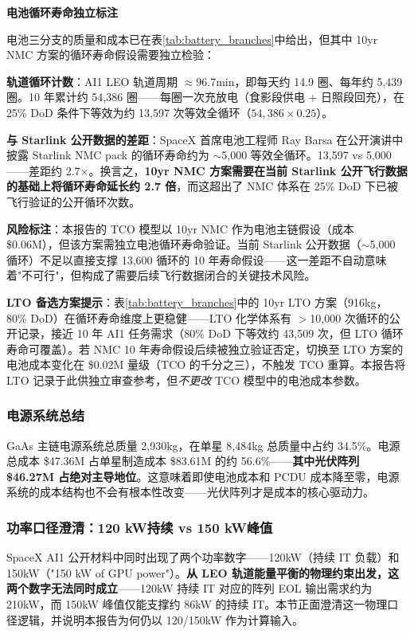 \medskip
\noindent\textbf{电池循环寿命独立标注}

电池三分支的质量和成本已在表\ref{tab:battery_branches}中给出，但其中 10yr NMC 方案的循环寿命假设需要独立检验：

\smallskip
\noindent\textbf{轨道循环计数}：AI1 LEO 轨道周期 $\approx$96.7\;min，即每天约 14.9 圈、每年约 5,439 圈。10 年累计约 54,386 圈——每圈一次充放电（食影段供电 + 日照段回充），在 25\% DoD 条件下等效为约 13,597 次等效全循环（$54{,}386 \times 0.25$）。

\smallskip
\noindent\textbf{与 Starlink 公开数据的差距}：SpaceX 首席电池工程师 Ray Barsa 在公开演讲中披露 Starlink NMC pack 的循环寿命约为 $\sim$5,000 等效全循环。13,597 vs 5,000——差距约 2.7$\times$。换言之，\textbf{10yr NMC 方案需要在当前 Starlink 公开飞行数据的基础上将循环寿命延长约 2.7 倍}，而这超出了 NMC 体系在 25\% DoD 下已被飞行验证的公开循环次数。

\smallskip
\noindent\textbf{风险标注}：本报告的 TCO 模型以 10yr NMC 作为电池主链假设（成本 \$0.06M），但该方案需独立电池循环寿命验证。当前 Starlink 公开数据（$\sim$5,000 循环）不足以直接支撑 13,600 循环的 10 年寿命假设——这一差距不自动意味着"不可行"，但构成了需要后续飞行数据闭合的关键技术风险。

\smallskip
\noindent\textbf{LTO 备选方案提示}：表\ref{tab:battery_branches}中的 10yr LTO 方案（916\;kg，80\% DoD）在循环寿命维度上更稳健——LTO 化学体系有 $>$10,000 次循环的公开记录，接近 10 年 AI1 任务需求（80\% DoD 下等效约 43,509 次，但 LTO 循环寿命可覆盖）。若 NMC 10 年寿命假设后续被独立验证否定，切换至 LTO 方案的电池成本变化在 \$0.02M 量级（TCO 的千分之三），不触发 TCO 重算。本报告将 LTO 记录于此供独立审查参考，但\emph{不更改} TCO 模型中的电池成本参数。

\subsubsection{电源系统总结}

GaAs 主链电源系统总质量 2,930\;kg，在单星 8,484\;kg 总质量中占约 34.5\%。电源总成本 \$47.36M 占单星制造成本 \$83.61M 的约 56.6\%——\textbf{其中光伏阵列 \$46.27M 占绝对主导地位}。这意味着即使电池成本和 PCDU 成本降至零，电源系统的成本结构也不会有根本性改变——光伏阵列才是成本的核心驱动力。

\subsubsection{功率口径澄清：120 kW持续 vs 150 kW峰值}

SpaceX AI1 公开材料中同时出现了两个功率数字——120\;kW（持续 IT 负载）和 150\;kW（"150 kW of GPU power"）。\textbf{从 LEO 轨道能量平衡的物理约束出发，这两个数字无法同时成立}——120\;kW 持续 IT 对应的阵列 EOL 输出需求约为 210\;kW，而 150\;kW 峰值仅能支撑约 86\;kW 的持续 IT。本节正面澄清这一物理口径逻辑，并说明本报告为何仍以 120/150\;kW 作为计算输入。

